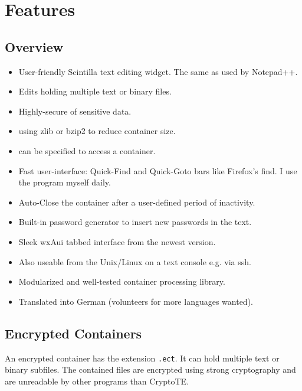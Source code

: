 \documentclass[a4paper,12pt,twoside]{article}
\begin{document}
\section{Features}\label{Features}

\subsection{Overview}\label{Overview}

\begin{itemize}
  \item User-friendly Scintilla text editing widget. The same as used by Notepad++.
  \item Edits  holding multiple text or binary files.
  \item Highly-secure  of sensitive data.
  \item {} using zlib or bzip2 to reduce container size.
  \item {} can be specified to access a container.
  \item Fast user-interface: Quick-Find and Quick-Goto bars like Firefox's find. I use the program myself daily.
  \item Auto-Close the container after a user-defined period of inactivity.
  \item Built-in password generator to insert new passwords in the text.
  \item Sleek wxAui tabbed interface from the newest  version.
  \item Also useable from the Unix/Linux  on a text console e.g. via ssh.
  \item Modularized and well-tested container processing library.
  \item Translated into German (volunteers for more languages wanted).
\end{itemize}

\subsection{Encrypted Containers}\label{Containers}

An encrypted container has the extension \texttt{.ect}. It can hold multiple text or binary subfiles. The contained files are encrypted using strong cryptography and are unreadable by other programs than CryptoTE.
\end{document}
